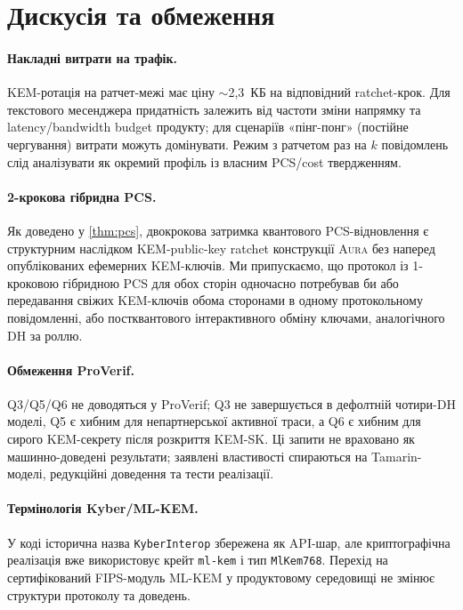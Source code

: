 \documentclass[11pt,a4paper]{article}
\theoremstyle{definition}
\newcommand{\Aura}{\mbox{\normalfont\scshape Aura}}
\begin{document}
\section{Дискусія та обмеження}\label{sec:discussion}

\paragraph{Накладні витрати на трафік.}
KEM-ротація на ратчет-межі має ціну $\sim$2{,}3~КБ на відповідний
ratchet-крок. Для текстового месенджера придатність залежить від
частоти зміни напрямку та latency/bandwidth budget продукту; для
сценаріїв «пінг-понг» (постійне чергування) витрати можуть домінувати.
Режим з ратчетом раз на $k$ повідомлень слід аналізувати як окремий
профіль із власним PCS/cost твердженням.

\paragraph{2-крокова гібридна PCS.}
Як доведено у \cref{thm:pcs}, двокрокова затримка квантового
PCS-відновлення є структурним наслідком KEM-public-key ratchet
конструкції \Aura{} без наперед опублікованих ефемерних KEM-ключів.
Ми припускаємо, що протокол із 1-кроковою гібридною PCS
для обох сторін одночасно потребував би або передавання свіжих KEM-ключів
обома сторонами в одному протокольному повідомленні, або постквантового
інтерактивного обміну ключами, аналогічного DH за роллю.

\paragraph{Обмеження ProVerif.}
Q3/Q5/Q6 не доводяться у ProVerif; Q3 не завершується в дефолтній
чотири-DH моделі, Q5 є хибним для непартнерської активної траси, а Q6
є хибним для сирого KEM-секрету після розкриття KEM-SK. Ці запити не
враховано як машинно-доведені результати; заявлені властивості спираються
на Tamarin-моделі, редукційні доведення та тести реалізації.

\paragraph{Термінологія Kyber/ML-KEM.}
У коді історична назва \texttt{KyberInterop} збережена як API-шар, але
криптографічна реалізація вже використовує крейт \texttt{ml-kem} і тип
\texttt{MlKem768}. Перехід на сертифікований FIPS-модуль ML-KEM у
продуктовому середовищі не змінює структури протоколу та доведень.
\end{document}
